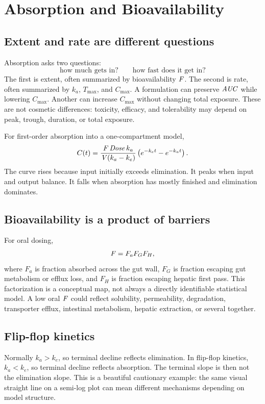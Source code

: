 \documentclass[a4paper]{article}
\newcommand{\pkV}{\pksym{V}}
\newcommand{\pkF}{\pksym{F}}
\newcommand{\pkAUC}{\pksym{AUC}}
\newcommand{\pkCmax}{C_{\max}}
\newcommand{\pkTmax}{T_{\max}}
\begin{document}
\section{Absorption and Bioavailability}

\subsection{Extent and rate are different questions}

Absorption asks two questions:
\[
  \text{how much gets in?}
  \qquad
  \text{how fast does it get in?}
\]
The first is extent, often summarized by bioavailability \(\pkF\). The second is rate, often summarized by \(k_a\), \(\pkTmax\), and \(\pkCmax\). A formulation can preserve \(\pkAUC\) while lowering \(\pkCmax\). Another can increase \(\pkCmax\) without changing total exposure. These are not cosmetic differences: toxicity, efficacy, and tolerability may depend on peak, trough, duration, or total exposure.

For first-order absorption into a one-compartment model,
\[
  C(t)=
  \frac{\pkF\,\pksym{Dose}\,k_a}{\pkV(k_a-k_e)}
  \left(e^{-k_e t}-e^{-k_a t}\right).
\]
The curve rises because input initially exceeds elimination. It peaks when input and output balance. It falls when absorption has mostly finished and elimination dominates.

\subsection{Bioavailability is a product of barriers}

For oral dosing,
\[
  \pkF = F_a F_G F_H,
\]
where \(F_a\) is fraction absorbed across the gut wall, \(F_G\) is fraction escaping gut metabolism or efflux loss, and \(F_H\) is fraction escaping hepatic first pass. This factorization is a conceptual map, not always a directly identifiable statistical model. A low oral \(\pkF\) could reflect solubility, permeability, degradation, transporter efflux, intestinal metabolism, hepatic extraction, or several together.

\figureAbsorptionBarriers

\subsection{Flip-flop kinetics}

Normally \(k_a>k_e\), so terminal decline reflects elimination. In flip-flop kinetics, \(k_a<k_e\), so terminal decline reflects absorption. The terminal slope is then not the elimination slope. This is a beautiful cautionary example: the same visual straight line on a semi-log plot can mean different mechanisms depending on model structure.
\end{document}
